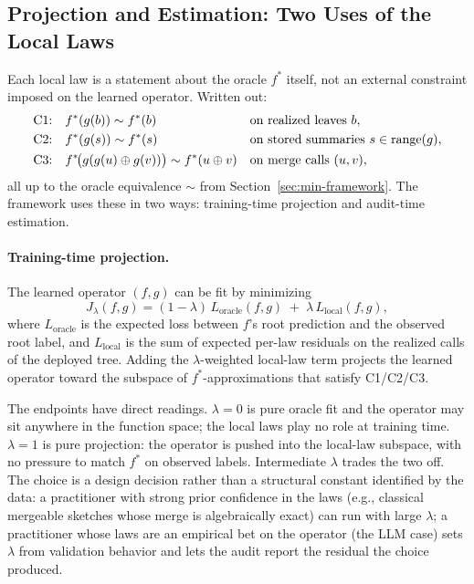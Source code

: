 \subsection{Projection and Estimation: Two Uses of the Local Laws}\label{sec:min-projection-estimation}

Each local law is a statement about the oracle $f^*$ itself, not an
external constraint imposed on the learned operator. Written out:
\begin{align}
\text{C1:}\quad & f^\ast(g(b)) \sim f^\ast(b) && \text{on realized leaves } b, \notag \\
\text{C2:}\quad & f^\ast(g(s)) \sim f^\ast(s) && \text{on stored summaries } s \in \operatorname{range}(g), \notag \\
\text{C3:}\quad & f^\ast\!\big(g(g(u)\oplus g(v))\big) \sim f^\ast(u\oplus v) && \text{on merge calls } (u, v), \notag
\end{align}
all up to the oracle equivalence $\sim$ from
Section~\ref{sec:min-framework}. The framework uses these in two ways:
training-time projection and audit-time estimation.

\paragraph{Training-time projection.} The learned operator $(f, g)$
can be fit by minimizing
\begin{equation}\label{eq:min-J-lambda}
J_\lambda(f, g) = (1 - \lambda)\,L_{\text{oracle}}(f, g)
\;+\; \lambda\,L_{\text{local}}(f, g),
\end{equation}
where $L_{\text{oracle}}$ is the expected loss between $f$'s root
prediction and the observed root label, and $L_{\text{local}}$ is the
sum of expected per-law residuals on the realized calls of the
deployed tree. Adding the $\lambda$-weighted local-law term projects
the learned operator toward the subspace of $f^*$-approximations that
satisfy C1/C2/C3.

The endpoints have direct readings. $\lambda = 0$ is pure oracle
fit and the operator may sit anywhere in the function space; the
local laws play no role at training time. $\lambda = 1$ is pure
projection: the operator is pushed into the local-law subspace, with
no pressure to match $f^*$ on observed labels. Intermediate $\lambda$
trades the two off. The choice is a design decision rather than a
structural constant identified by the data: a practitioner with
strong prior confidence in the laws (e.g., classical mergeable
sketches whose merge is algebraically exact) can run with large
$\lambda$; a practitioner whose laws are an empirical bet on the
operator (the LLM case) sets $\lambda$ from validation behavior and
lets the audit report the residual the choice produced.

